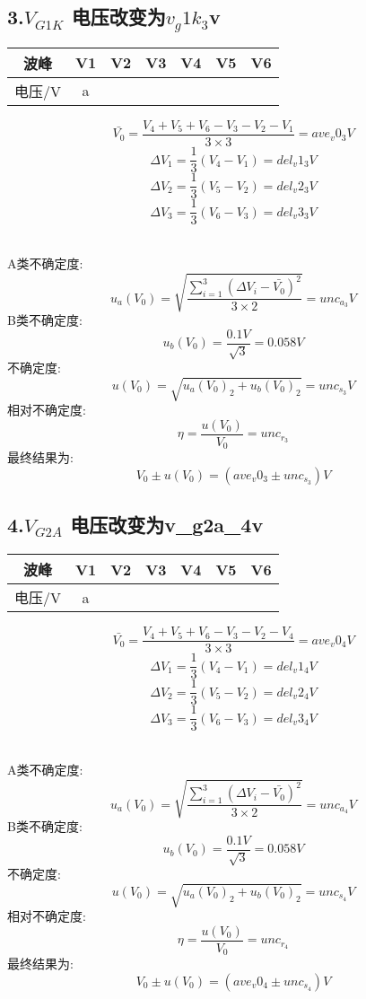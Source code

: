 \subsection*{3.$V_{G1K}$ 电压改变为${{v_g1k_3}}$v}
\begin{center}
\begin{tabular}{|c|c|c|c|c|c|c|}
	\hline
	波峰&V1&V2&V3&V4&V5&V6
	\\\hline
	电压/V
	{%
		&{{a}}
	{%
	\\\hline
	\end{tabular}
	\end{center}

$$  \bar{V_0}=\frac{V_4+V_5+V_6-V_3-V_2-V_1}{3\times 3}={{ave_v0_3}}V $$
$$	\Delta V_1=\frac{1}{3}(V_4-V_1)={{del_v1_3}}V $$
$$	\Delta V_2=\frac{1}{3}(V_5-V_2)={{del_v2_3}}V $$
$$	\Delta V_3=\frac{1}{3}(V_6-V_3)={{del_v3_3}}V $$ 

\ \\
A类不确定度:
$$	u_a(V_0)=\sqrt{\frac{\sum\limits_{i=1}^{3} (\Delta V_i-\bar{V_0})^2}{3\times 2}}={{ unc_a_3 }}V $$
B类不确定度:
$$	u_b(V_0)=\frac{0.1V}{\sqrt{3}}=0.058V $$
不确定度:
$$	u(V_0)=\sqrt{u_a(V_0)_2+u_b(V_0)_2}={{unc_s_3}}V $$
相对不确定度:
$$	\eta=\frac{u(V_0)}{V_0}={{unc_r_3}} $$
最终结果为:
$$	V_0 \pm u(V_0) = ({{ave_v0_3}} \pm {{ unc_s_3}})V $$


\subsection*{4.$V_{G2A}$ 电压改变为{{v_g2a_4}}v}
\begin{center}
\begin{tabular}{|c|c|c|c|c|c|c|}
	\hline
	波峰&V1&V2&V3&V4&V5&V6
	\\\hline
	电压/V
	{%
		&{{a}}
	{%
	\\\hline
	\end{tabular}
	\end{center}

$$  \bar{V_0}=\frac{V_4+V_5+V_6-V_3-V_2-V_4}{3\times 3}={{ave_v0_4}}V $$
$$	\Delta V_1=\frac{1}{3}(V_4-V_1)={{del_v1_4}}V $$
$$	\Delta V_2=\frac{1}{3}(V_5-V_2)={{del_v2_4}}V $$
$$	\Delta V_3=\frac{1}{3}(V_6-V_3)={{del_v3_4}}V $$ 

\ \\
A类不确定度:
$$	u_a(V_0)=\sqrt{\frac{\sum\limits_{i=1}^{3} (\Delta V_i-\bar{V_0})^2}{3\times 2}}={{ unc_a_4 }}V $$
B类不确定度:
$$	u_b(V_0)=\frac{0.1V}{\sqrt{3}}=0.058V $$
不确定度:
$$	u(V_0)=\sqrt{u_a(V_0)_2+u_b(V_0)_2}={{unc_s_4}}V $$
相对不确定度:
$$	\eta=\frac{u(V_0)}{V_0}={{unc_r_4}} $$
最终结果为:
$$	V_0 \pm u(V_0) = ({{ave_v0_4}} \pm {{ unc_s_4}})V $$

\iffalse
\begin{comment}
\begin{figure}[H]
	\centering
		\texttt{[image: lab2151\_1.png]}
    \caption{四条曲线对比图(仅供参考，实际图片请根据实验数据自行绘制)}
	\end{figure}

\subsection*{5.示波器自动测量}

\begin{figure}[H]
	\centering
		\texttt{[image: lab2151\_2.png]}
	\end{figure}

\end{comment}
\fi
